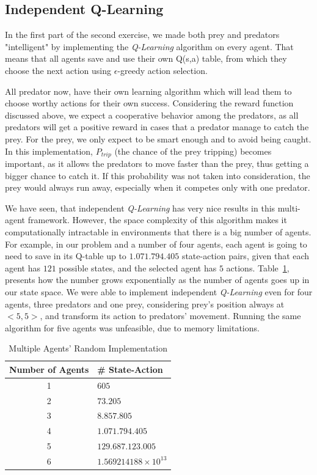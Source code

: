\documentclass[a4paper,11pt]{article}
\begin{document}
\subsection{Independent Q-Learning}
In the first part of the second exercise, we made both prey and predators "intelligent" by implementing the \textit{Q-Learning} algorithm on every agent. That means that all agents save and use their own Q(s,a) table, from which they choose the next action using $\epsilon$-greedy action selection.

All predator now, have their own learning algorithm which will lead them to choose worthy actions for their own success. Considering the reward function discussed above, we expect a cooperative behavior among the predators, as all predators will get a positive reward in cases that a predator manage to catch the prey. For the prey, we only expect to be smart enough and to avoid being caught. In this implementation, $P_{trip}$ (the chance of the prey tripping) becomes important, as it allows the predators to move faster than the prey, thus getting a bigger chance to catch it. If this probability was not taken into consideration, the prey would always run away, especially when it competes only with one predator.


We have seen, that independent \textit{Q-Learning} has very nice results in this multi-agent framework. However, the space complexity of this algorithm makes it computationally intractable in environments that there is a big number of agents. For example, in our problem and a number of four agents, each agent is going to need to save in its Q-table up to $1.071.794.405$ state-action pairs, given that each agent has $121$ possible states, and the selected agent has $5$ actions. Table~\ref{table:complexity}, presents how the number grows exponentially as the number of agents goes up in our state space. We were able to implement independent \textit{Q-Learning} even for four agents, three predators and one prey, considering prey's position always at $<5,5>$, and transform its action to predators' movement. Running the same algorithm for five agents was unfeasible, due to memory limitations.


\begin{table}[h]
\begin{center}
\caption{Multiple Agents' Random Implementation}
\begin{tabular}{c l} 
\hline\hline               
\textbf{\small{Number of Agents}} & \textbf{\small{\# State-Action}} \\  
\hline
1 & $605$\\ 
2 & $73.205$\\
3 & $8.857.805$\\
4 & $1.071.794.405$\\
5 & $129.687.123.005$\\
6 & $1.569214188 \times 10^{13}$\\
\end{tabular}
\label{table:complexity} 
\end{center} 
\end{table} 
\end{document}
